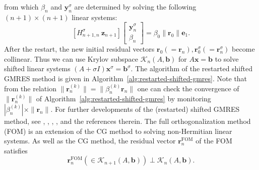 {from which $\beta_n$ and $\bm y_n^{\sigma}$ are determined by solving the following $(n+1)\times(n+1)$ linear systems:}
\begin{equation}\label{eq:restarted-shifted-gmres-collinearity-system}[H_{n+1,n}^{\sigma}\ \bm z_{n+1}]\begin{bmatrix}\bm y_n^{\sigma}\\\beta_n\end{bmatrix}=\beta_0\|\bm r_0\|\bm e_1.\end{equation}
{After the restart, the new initial residual vectors $\bm r_0(=\bm r_n),\bm r_0^{\sigma}(=\bm r_n^{\sigma})$ become collinear. Thus we can use Krylov subspace $\mathcal K_n(A,\bm b)$ for $A\bm x=\bm b$ to solve shifted linear systems $(A+\sigma I)\bm x^{\sigma}=\bm b^{\sigma}$. The algorithm of the restarted shifted GMRES method is given in Algorithm\ \ref{alg:restarted-shifted-gmres}.}
{Note that from the relation $\|\bm r_n^{(k)}\|=\|\beta_n^{(k)}\bm r_n\|$ one can check the convergence of $\|\bm r_n^{(k)}\|$ of Algorithm\ \ref{alg:restarted-shifted-gmres} by monitoring $|\beta_n^{(k)}|\times\|\bm r_n\|$. For further developments of the (restarted) shifted GMRES method, see , , , , and the references therein.}
{The full orthogonalization method (FOM)  is an extension of the CG method to solving non-Hermitian linear systems. As well as the CG method, the residual vector $\bm r_n^{\mathrm{FOM}}$ of the FOM satisfies}
\[\bm r_n^{\mathrm{FOM}}(\in\mathcal K_{n+1}(A,\bm b))\perp\mathcal K_n(A,\bm b).\]
